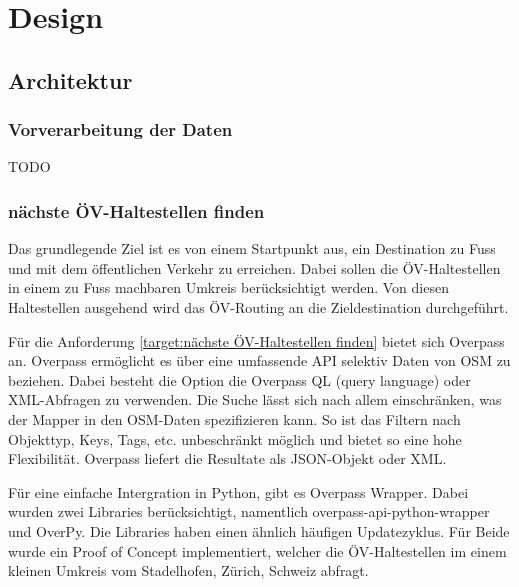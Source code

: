 
\section{Design}
\label{sec:Design}

\subsection{Architektur}
\label{sub:Architektur}

\subsubsection{Vorverarbeitung der Daten}
\label{architektur:Vorverarbeitung der Daten}

TODO

\subsubsection{nächste ÖV-Haltestellen finden}
\label{architection:nächste ÖV-Haltestellen finden}

Das grundlegende Ziel ist es von einem Startpunkt aus, ein Destination zu Fuss und mit dem öffentlichen Verkehr zu erreichen. Dabei sollen die ÖV-Haltestellen in einem zu Fuss machbaren Umkreis berücksichtigt werden. Von diesen Haltestellen ausgehend wird das ÖV-Routing an die Zieldestination durchgeführt.

Für die Anforderung \ref{target:nächste ÖV-Haltestellen finden} bietet sich Overpass an. Overpass ermöglicht es über eine umfassende \acs{API} selektiv Daten von \acs{OSM} zu beziehen. Dabei besteht die Option die Overpass QL (query language) oder XML-Abfragen zu verwenden. Die Suche lässt sich nach allem einschränken, was der Mapper in den \acs{OSM}-Daten spezifizieren kann. So ist das Filtern nach Objekttyp, Keys, Tags, etc. unbeschränkt möglich und bietet so eine hohe Flexibilität. Overpass liefert die Resultate als JSON-Objekt oder XML. 

Für eine einfache Intergration in Python, gibt es Overpass Wrapper. Dabei wurden zwei Libraries berücksichtigt, namentlich overpass-api-python-wrapper und OverPy. Die Libraries haben einen ähnlich häufigen Updatezyklus. Für Beide wurde ein Proof of Concept implementiert, welcher die ÖV-Haltestellen im einem kleinen Umkreis vom Stadelhofen, Zürich, Schweiz abfragt.

